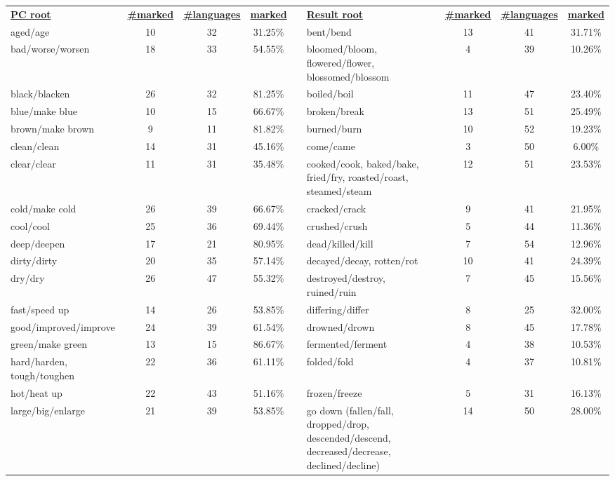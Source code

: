 \begin{tabular}{p{3cm}ccccp{3cm}ccc}
\underline{\textbf{PC root}} & \underline{\textbf{\#marked}} & \underline{\textbf{\#languages}} & \underline{\textbf{marked}} & & \underline{\textbf{Result root}} & \underline{\textbf{\#marked}} & \underline{\textbf{\#languages}} & \underline{\textbf{marked}} \\
aged/age & 10 & 32 & 31.25\% & & bent/bend & 13 & 41 & 31.71\% \\
bad/worse/worsen & 18 & 33 & 54.55\% & & bloomed/bloom, flowered/flower, blossomed/blossom & 4 & 39 & 10.26\% \\
black/blacken & 26 & 32 & 81.25\% & & boiled/boil & 11 & 47 & 23.40\% \\
blue/make blue & 10 & 15 & 66.67\% & & broken/break & 13 & 51 & 25.49\% \\
brown/make brown & 9 & 11 & 81.82\% & & burned/burn & 10 & 52 & 19.23\% \\
clean/clean & 14 & 31 & 45.16\% & & come/came & 3 & 50 & 6.00\% \\
clear/clear & 11 & 31 & 35.48\% & & cooked/cook, baked/bake, fried/fry, roasted/roast, steamed/steam & 12 & 51 & 23.53\% \\
cold/make cold & 26 & 39 & 66.67\% & & cracked/crack & 9 & 41 & 21.95\% \\
cool/cool & 25 & 36 & 69.44\% & & crushed/crush & 5 & 44 & 11.36\% \\
deep/deepen & 17 & 21 & 80.95\% & & dead/killed/kill & 7 & 54 & 12.96\% \\
dirty/dirty & 20 & 35 & 57.14\% & & decayed/decay, rotten/rot & 10 & 41 & 24.39\% \\
dry/dry & 26 & 47 & 55.32\% & & destroyed/destroy, ruined/ruin & 7 & 45 & 15.56\% \\
fast/speed up & 14 & 26 & 53.85\% & & differing/differ & 8 & 25 & 32.00\% \\
good/improved/improve & 24 & 39 & 61.54\% & & drowned/drown & 8 & 45 & 17.78\% \\
green/make green & 13 & 15 & 86.67\% & & fermented/ferment & 4 & 38 & 10.53\% \\
hard/harden, tough/toughen & 22 & 36 & 61.11\% & & folded/fold & 4 & 37 & 10.81\% \\
hot/heat up & 22 & 43 & 51.16\% & & frozen/freeze & 5 & 31 & 16.13\% \\
large/big/enlarge & 21 & 39 & 53.85\% & & go down (fallen/fall, dropped/drop, descended/descend, decreased/decrease, declined/decline) & 14 & 50 & 28.00\% \\

\end{tabular}
